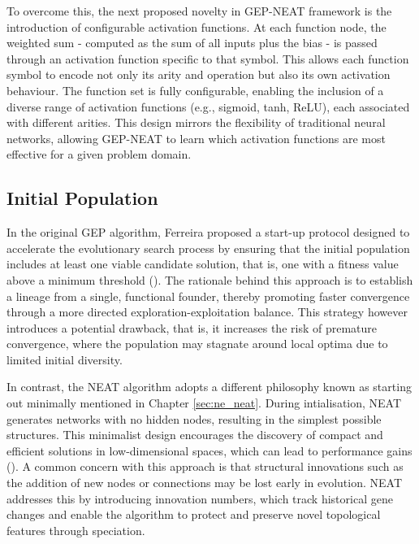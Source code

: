 \parbreak\noindent To overcome this, the next proposed novelty in GEP-NEAT framework is the introduction of configurable activation functions. At each function node, the weighted sum - computed as the sum of all inputs plus the bias - is passed through an activation function specific to that symbol. This allows each function symbol to encode not only its arity and operation but also its own activation behaviour. The function set is fully configurable, enabling the inclusion of a diverse range of activation functions (e.g., sigmoid, tanh, ReLU), each associated with different arities. This design mirrors the flexibility of traditional neural networks, allowing GEP-NEAT to learn which activation functions are most effective for a given problem domain.

\subsection{Initial Population}
\noindent In the original GEP algorithm, Ferreira proposed a start-up protocol designed to accelerate the evolutionary search process by ensuring that the initial population includes at least one viable candidate solution, that is, one with a fitness value above a minimum threshold (\cite{ferreira2006gene}). The rationale behind this approach is to establish a lineage from a single, functional founder, thereby promoting faster convergence through a more directed exploration-exploitation balance. This strategy however introduces a potential drawback, that is, it increases the risk of premature convergence, where the population may stagnate around local optima due to limited initial diversity.

\parbreak\noindent In contrast, the NEAT algorithm adopts a different philosophy known as starting out minimally mentioned in Chapter \ref{sec:ne_neat}. During intialisation, NEAT generates networks with no hidden nodes, resulting in the simplest possible structures. This minimalist design encourages the discovery of compact and efficient solutions in low-dimensional spaces, which can lead to performance gains (\cite{stanley2002evolving}). A common concern with this approach is that structural innovations such as the addition of new nodes or connections may be lost early in evolution. NEAT addresses this by introducing innovation numbers, which track historical gene changes and enable the algorithm to protect and preserve novel topological features through speciation.

